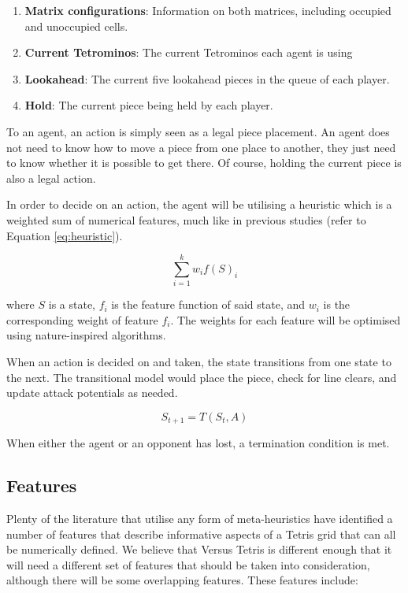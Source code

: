\documentclass[a4paper, 12pt]{extreport}
\begin{document}
				\begin{enumerate}
					\item \textbf{Matrix configurations}: Information on both matrices, including occupied and unoccupied cells.
					\item \textbf{Current Tetrominos}: The current Tetrominos each agent is using
					\item \textbf{Lookahead}: The current five lookahead pieces in the queue of each player.
					\item \textbf{Hold}: The current piece being held by each player.
				\end{enumerate}
				
				To an agent, an action is simply seen as a legal piece placement. An agent does not need to know how to move a piece from one place to another, they just need to know whether it is possible to get there. Of course, holding the current piece is also a legal action.
				
				In order to decide on an action, the agent will be utilising a heuristic which is a weighted sum of numerical features, much like in previous studies (refer to Equation \ref{eq:heuristic}).
				
				\begin{equation}\label{eq:heuristic}
					\sum_{i=1}^{k} w_i f(S)_i
				\end{equation}
				
				\noindent where $S$ is a state, $f_i$ is the feature function of said state, and $w_i$ is the corresponding weight of feature $f_i$. The weights for each feature will be optimised using nature-inspired algorithms.
				
				When an action is decided on and taken, the state transitions from one state to the next. The transitional model would place the piece, check for line clears, and update attack potentials as needed.
				
				\begin{equation}
					S_{t+1} = T(S_t, A)
				\end{equation}
				
				When either the agent or an opponent has lost, a termination condition is met.
				
			\subsection{Features}\label{subsec:features}
				
				Plenty of the literature that utilise any form of meta-heuristics have identified a number of features that describe informative aspects of a Tetris grid that can all be numerically defined. We believe that Versus Tetris is different enough that it will need a different set of features that should be taken into consideration, although there will be some overlapping features. These features include:
				
\end{document}
